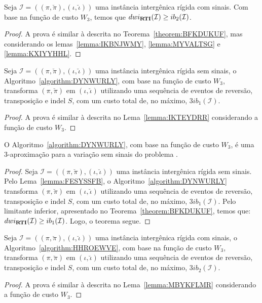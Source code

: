 \begin{theorem}\label{theorem:ACJPZCWD}
Seja $\mathcal{I} = ((\pi,\breve\pi),(\iota,\breve\iota))$ uma instância intergênica rígida com sinais. Com base na função de custo $W_3$, temos que $dwi_{\textbf{RTI}}(\mathcal{I}) \ge ib_2(\mathcal{I})$.
\begin{proof}
A prova é similar à descrita no Teorema~\ref{theorem:BFKDUKUF}, mas considerando os lemas~\ref{lemma:IKBNJWMY}, \ref{lemma:MYVALTSG} e \ref{lemma:KXIYYHHL}.
\end{proof}
\end{theorem}

\begin{lemma}\label{lemma:FESYSSFB}
Seja $\mathcal{I} = ((\pi,\breve\pi),(\iota,\breve\iota))$ uma instância intergênica rígida sem sinais, o Algoritmo~\ref{algorithm:DYNWURLY}, com base na função de custo $W_3$, transforma $(\pi,\breve\pi)$ em $(\iota,\breve\iota)$ utilizando uma sequência de eventos de reversão, transposição e indel $S$, com um custo total de, no máximo, $3ib_1(\mathcal{I})$.
\end{lemma}
\begin{proof}
  A prova é similar à descrita no Lema~\ref{lemma:IKTEYDRR} considerando a função de custo $W_3$.
\end{proof}

\begin{theorem}\label{theorem:YFYDIUAB}
O Algoritmo~\ref{algorithm:DYNWURLY}, com base na função de custo $W_3$, é uma $3$-aproximação para a variação sem sinais do problema \SbWIRTI{}.
\end{theorem}
\begin{proof}
Seja $\mathcal{I} = ((\pi,\breve\pi),(\iota,\breve\iota))$ uma instância intergênica rígida sem sinais. Pelo Lema~\ref{lemma:FESYSSFB}, o Algoritmo~\ref{algorithm:DYNWURLY} transforma $(\pi,\breve\pi)$ em $(\iota,\breve\iota)$ utilizando uma sequência de eventos de reversão, transposição e indel $S$, com um custo total de, no máximo, $3ib_1(\mathcal{I})$. Pelo limitante inferior, apresentado no Teorema~\ref{theorem:BFKDUKUF}, temos que: $dwi_{\textbf{RTI}}(\mathcal{I}) \ge ib_1(\mathcal{I})$. Logo, o teorema segue.
\end{proof}

\begin{lemma}\label{lemma:HRFGEWNU}
Seja $\mathcal{I} = ((\pi,\breve\pi),(\iota,\breve\iota))$ uma instância intergênica rígida com sinais, o Algoritmo~\ref{algorithm:HHROEWVE}, com base na função de custo $W_3$, transforma $(\pi,\breve\pi)$ em $(\iota,\breve\iota)$ utilizando uma sequência de eventos de reversão, transposição e indel $S$, com um custo total de, no máximo, $3ib_2(\mathcal{I})$.
\end{lemma}
\begin{proof}
  A prova é similar à descrita no Lema~\ref{lemma:MBYKFLMR} considerando a função de custo $W_3$.
\end{proof}

